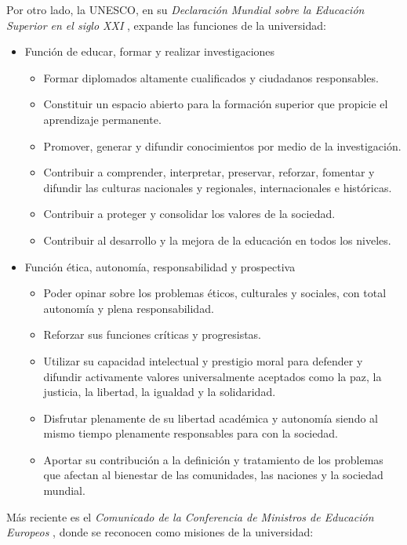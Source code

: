 \documentclass[a4paper,12pt,twoside]{article}
\begin{document}
Por otro lado, la UNESCO, en su \textit{Declaración Mundial sobre la Educación Superior en el siglo XXI} \cite{unesco}, expande las funciones de la universidad:

\begin{itemize}
\item Función de educar, formar y realizar investigaciones
\begin{itemize}
\item Formar diplomados altamente cualificados y ciudadanos responsables.
\item Constituir un espacio abierto para la formación superior que propicie el
aprendizaje permanente.
\item Promover, generar y difundir conocimientos por medio de la investigación.
\item Contribuir a comprender, interpretar, preservar, reforzar, fomentar y difundir
las culturas nacionales y regionales, internacionales e históricas.
\item Contribuir a proteger y consolidar los valores de la sociedad.
\item Contribuir al desarrollo y la mejora de la educación en todos los niveles.
\end{itemize}
\item Función ética, autonomía, responsabilidad y prospectiva
\begin{itemize}
\item Poder opinar sobre los problemas éticos, culturales y sociales, con total
autonomía y plena responsabilidad.
\item Reforzar sus funciones críticas y progresistas.
\item Utilizar su capacidad intelectual y prestigio moral para defender y difundir
activamente valores universalmente aceptados como la paz, la justicia, la libertad, la igualdad y la solidaridad.
\item Disfrutar plenamente de su libertad académica y autonomía siendo al mismo tiempo
plenamente responsables para con la sociedad.
\item Aportar su contribución a la definición y tratamiento de los problemas que
afectan al bienestar de las comunidades, las naciones y la sociedad mundial.
\end{itemize}
\end{itemize}

Más reciente es el \textit{Comunicado de la Conferencia de Ministros de Educación Europeos} \cite{Com2009}, donde se reconocen como misiones de la universidad:
\end{document}
